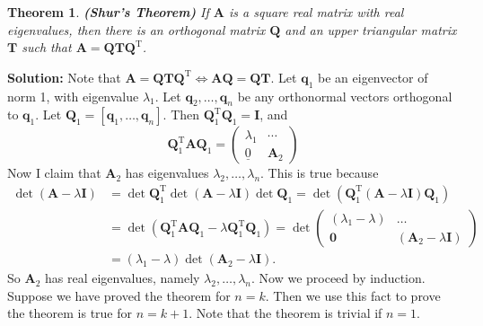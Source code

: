 \documentclass[13pt]{article}
\newtheorem{theorem}{Theorem}[section]
\theoremstyle{definition}
\newenvironment{solution}
{\color{C2}\begin{framed}\begingroup\textbf{Solution:} }
  {\endgroup\end{framed}}
\theoremstyle{remark}
\begin{document}
\begin{theorem}
    \textbf{(Shur's Theorem)}  If $\boldsymbol{A}$ is a square real matrix with real eigenvalues, then there is an orthogonal matrix $\boldsymbol{Q}$ and an upper triangular matrix $\boldsymbol{T}$ such that $\boldsymbol{A}=\boldsymbol{Q} \boldsymbol{T} \boldsymbol{Q}^{\mathrm{T}}$.

\end{theorem}
\begin{solution}
    Note that $\boldsymbol{A}=\boldsymbol{Q} \boldsymbol{T} \boldsymbol{Q}^{\mathrm{T}} \Leftrightarrow \boldsymbol{A} \boldsymbol{Q}=\boldsymbol{Q} \boldsymbol{T}$. Let $\boldsymbol{q}_1$ be an eigenvector of norm 1, with eigenvalue $\lambda_1$. Let $\boldsymbol{q}_2, \ldots, \boldsymbol{q}_n$ be any orthonormal vectors orthogonal to $\boldsymbol{q}_1$. Let $\boldsymbol{Q}_1=\left[\boldsymbol{q}_1, \ldots, \boldsymbol{q}_n\right]$. Then $\boldsymbol{Q}_1^{\mathrm{T}} \boldsymbol{Q}_1=\boldsymbol{I}$, and
$$
\boldsymbol{Q}_1^{\mathrm{T}} \boldsymbol{A} \boldsymbol{Q}_1=\left(\begin{array}{cc}
\lambda_1 & \cdots \\
\underline{0} & \boldsymbol{A}_2
\end{array}\right)
$$
Now I claim that $\boldsymbol{A}_2$ has eigenvalues $\lambda_2, \ldots, \lambda_n$. This is true because
$$
\begin{aligned}
\operatorname{det}(\boldsymbol{A}-\lambda \boldsymbol{I}) & =\operatorname{det} \boldsymbol{Q}_1^{\mathrm{T}} \operatorname{det}(\boldsymbol{A}-\lambda \boldsymbol{I}) \operatorname{det} \boldsymbol{Q}_1=\operatorname{det}\left(\boldsymbol{Q}_1^{\mathrm{T}}(\boldsymbol{A}-\lambda \boldsymbol{I}) \boldsymbol{Q}_1\right) \\
& =\operatorname{det}\left(\boldsymbol{Q}_1^{\mathrm{T}} \boldsymbol{A} \boldsymbol{Q}_1-\lambda \boldsymbol{Q}_1^{\mathrm{T}} \boldsymbol{Q}_1\right)=\operatorname{det}\left(\begin{array}{cc}
\left(\lambda_1-\lambda\right) & \ldots \\
\mathbf{0} & \left(\boldsymbol{A}_2-\lambda \boldsymbol{I}\right)
\end{array}\right) \\
& =\left(\lambda_1-\lambda\right) \operatorname{det}\left(\boldsymbol{A}_2-\lambda \boldsymbol{I}\right) .
\end{aligned}
$$
So $\boldsymbol{A}_2$ has real eigenvalues, namely $\lambda_2, \ldots, \lambda_n$. Now we proceed by induction. Suppose we have proved the theorem for $n=k$. Then we use this fact to prove the theorem is true for $n=k+1$. Note that the theorem is trivial if $n=1$.


\end{solution}
\end{document}
